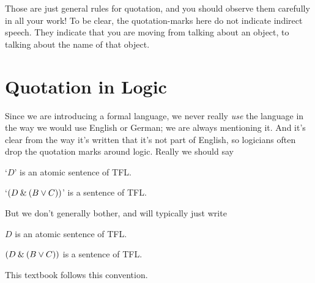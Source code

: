 Those are just general rules for quotation, and you should observe them carefully in all your work! To be clear, the quotation-marks here do not indicate indirect speech. They indicate that you are moving from talking about an object, to talking about the name of that object.

\section{Quotation in Logic}
Since we are introducing a formal language, we never really \emph{use} the language in the way we would use English or German; we are always mentioning it. And it's clear from the way it's written that it's not part of English, so logicians often drop the quotation marks around logic. Really we should say 
	\begin{ebullet}
		\item `$D$' is an atomic sentence of TFL.
			\item `$(D\mathbin{\&}(B\vee C))$' is a sentence of TFL.
	\end{ebullet} But we don't generally bother, and will typically just write 	\begin{ebullet}
			\item $D$ is an atomic sentence of TFL.
				\item $(D\mathbin{\&}(B\vee C))$ is a sentence of TFL.
			\end{ebullet}
This textbook follows this convention.

